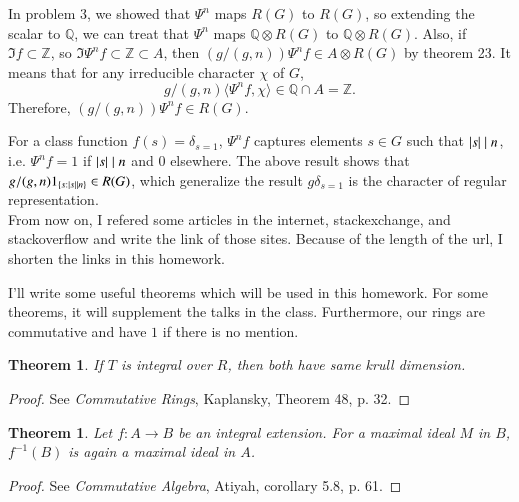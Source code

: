 \documentclass[a4paper, 12pt]{article}
\theoremstyle{Mydefinition}
\theoremstyle{Mytheorem}
\newtheorem{theorem}[statement]{Theorem}
\begin{document}
In problem 3, we showed that $\Psi^n$ maps $R(G)$ to $R(G)$, so extending the scalar to $\mathbb{Q}$, we can treat that $\Psi^n$ maps $\mathbb{Q}\otimes R(G)$ to $\mathbb{Q}\otimes R(G)$. Also, if $\Im f\subset\mathbb{Z}$, so $\Im\Psi^nf\subset \mathbb{Z}\subset A$, then $(g/(g,n))\Psi^nf\in A\otimes R(G)$ by theorem 23. It means that for any irreducible character $\chi$ of $G$,
\begin{equation}
    g/(g,n)\langle \Psi^n f, \chi\rangle \in\mathbb{Q}\cap A = \mathbb{Z}.
\end{equation}
Therefore, $(g/(g,n))\Psi^nf\in R(G)$. 

For a class function $f(s) = \delta_{s=1}$, $\Psi^n f$ captures elements $s\in G$ such that $\abs{s}\mid n$, i.e. $\Psi^n f = 1$ if $\abs{s}\mid n$ and $0$ elsewhere. The above result shows that $g/(g,n)1_{\{s:\abs{s}\mid n\}}\in R(G)$, which generalize the result $g \delta_{s=1}$ is the character of regular representation.\\

From now on, I refered some articles in the internet, stackexchange, and stackoverflow and write the link of those sites. Because of the length of the url, I shorten the links in this homework.

I'll write some useful theorems which will be used in this homework. For some theorems, it will supplement the talks in the class. Furthermore, our rings are commutative and have $1$ if there is no mention.
\begin{theorem}\label{HW11:TH:1}
If $T$ is integral over $R$, then both have same krull dimension.
\end{theorem}
\begin{proof}
See \textit{Commutative Rings}, Kaplansky, Theorem 48, p. 32.
\end{proof}
\begin{theorem}\label{HW11:TH:4}
Let $f:A\rightarrow B$ be an integral extension. For a maximal ideal $M$ in $B$, $f^{-1}(B)$ is again a maximal ideal in $A$.
\end{theorem}
\begin{proof}
See \textit{Commutative Algebra}, Atiyah, corollary 5.8, p. 61.
\end{proof}
\end{document}
